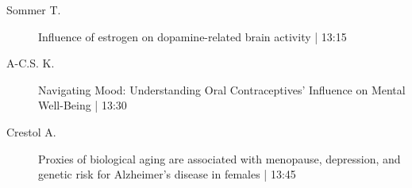 \begin{symposium}
\begin{description}
                \item [ Sommer T.] Influence of estrogen on dopamine-related brain activity \textcolor{mygray}{ | 13:15}    
                
                \item [ A-C.S. K.] Navigating Mood: Understanding Oral Contraceptives' Influence on Mental Well-Being  \textcolor{mygray}{ | 13:30}    
                
                \item [ Crestol A.] Proxies of biological aging are associated with menopause, depression, and genetic risk for Alzheimer’s disease in females \textcolor{mygray}{ | 13:45}    
                
            \end{description} 
            \end{symposium}
            